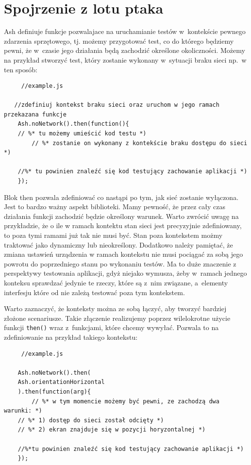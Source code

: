 \documentclass[brudnopis]{xmgr}
\begin{document}
\section{Spojrzenie z lotu ptaka}

Ash definiuje funkcje pozwalajace na uruchamianie testów w~kontekście pewnego zdarzenia sprzętowego, tj. możemy przygotować test, co do którego będziemy pewni, że w~czasie jego działania będą zachodzić określone okoliczności. Możemy na przykład stworzyć test, który zostanie wykonany w~sytuacji braku sieci np.~w ten sposób:

\begin{lstlisting}
     //example.js

   //zdefiniuj kontekst braku sieci oraz uruchom w jego ramach przekazana funkcje
    Ash.noNetwork().then(function(){
	// %* tu możemy umieścić kod testu *)
     	// %* zostanie on wykonany z kontekście braku dostępu do sieci *)

	//%* tu powinien znaleźć się kod testujący zachowanie aplikacji *) 
    });
\end{lstlisting}

Blok then pozwala zdefiniować co nastąpi po tym, jak sieć zostanie wyłączona. Jest to bardzo ważny aspekt biblioteki. Mamy pewność, że przez cały czas działania funkcji zachodzić będzie określony warunek. Warto zwrócić uwagę na przykładzie, że o ile w ramach kontektu stan sieci jest precyzyjnie zdefiniowany, to poza tymi ramami już tak nie musi być. Stan poza kontekstem możmy traktować jako dynamiczny lub nieokreślony. Dodatkowo należy pamiętać, że zmiana ustawień urządzenia w ramach kontekstu nie musi pociągać za sobą jego powrotu do poprzedniego stanu po wykonaniu testów. Ma to duże znaczenie z perspektywy testowania aplikacji, gdyż niejako wymusza, żeby w~ramach jednego konteksu sprawdzać jedynie te rzeczy, które są z~nim związane, a~elementy interfesju które od nie zależą testować poza tym kontekstem.

Warto zaznaczyć, że konteksty można ze sobą łączyć, aby tworzyć bardziej złożone scenariusze. Takie złączenie realizujemy poprzez wilelokrotne użycie funkcji \texttt{then()} wraz z~funkcjami, które chcemy wywyłać. Pozwala to na zdefiniowanie na przykład takiego kontekstu:

\begin{lstlisting}
     //example.js

    Ash.noNetwork().then(
	Ash.orientationHorizontal
    ).then(function(arg){
      	// %* w tym momencie możemy być pewni, ze zachodzą dwa warunki: *)
	// %* 1) dostęp do sieci został odcięty *) 
	// %* 2) ekran znajduje się w pozycji horyzontalnej *)

	//%*tu powinien znaleźć się kod testujący zachowanie aplikacji *) 
    });
\end{lstlisting}
\end{document}
